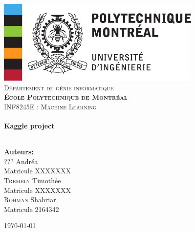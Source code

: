 \begin{center}
    
    \includegraphics[width=0.76\textwidth]{img/poly-logo.png}
    ~\\[1cm]
    
    \textsc{\LARGE Département de génie informatique \\\textbf{École Polytechnique de Montréal}}\\[1.5cm]
    
    \textsc{\Large INF8245E : Machine Learning}\\[0.5cm]
    
    \HRule \\[0.5cm]
    
    {\huge \bfseries Kaggle project} \\[0.5cm]
    
    \HRule \\[1.5cm]
    
    \begin{minipage}{0.4\textwidth}
    \begin{flushleft} \large
    \textbf{\LARGE Auteurs:}\\
    \Large \textsc{???} Andréa\\
    {\large Matricule XXXXXXX}\\
    \Large \textsc{Trembly} Timothée\\
    {\large Matricule XXXXXXX}\\
    \Large  \textsc{Rohman} Shahriar\\
    {\large Matricule 2164342}
    \end{flushleft}
    \end{minipage}
    \begin{minipage}{0.4\textwidth}
    \begin{flushright} \large
    \end{flushright}
    \end{minipage}
    
    \vspace{2cm}
    
    \textsc{\large \today}
    
    \thispagestyle{empty}
    
\end{center}